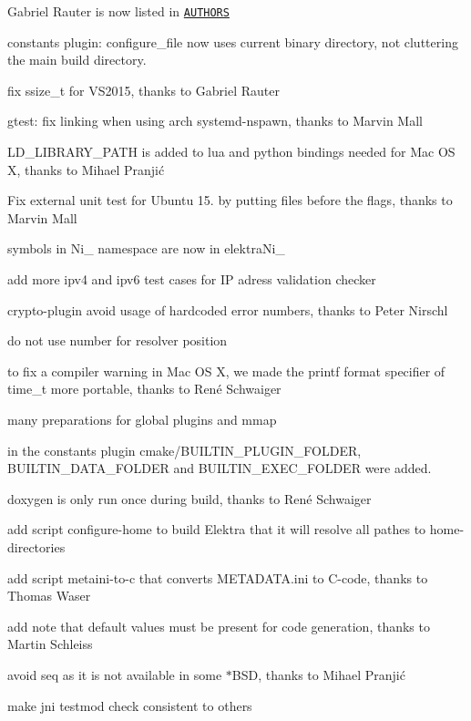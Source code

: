 \begin{DoxyItemize}
\item Gabriel Rauter is now listed in \href{https://github.com/elektrainitiative/libelektra/tree/master/doc/AUTHORS}{\tt A\+U\+T\+H\+O\+R\+S}
\item constants plugin\+: configure\+\_\+file now uses current binary directory, not cluttering the main build directory.
\item fix ssize\+\_\+t for V\+S2015, thanks to Gabriel Rauter
\item gtest\+: fix linking when using arch systemd-\/nspawn, thanks to Marvin Mall
\item {\ttfamily L\+D\+\_\+\+L\+I\+B\+R\+A\+R\+Y\+\_\+\+P\+A\+T\+H} is added to lua and python bindings needed for Mac O\+S X, thanks to Mihael Pranjić
\item Fix external unit test for Ubuntu 15. by putting files before the flags, thanks to Marvin Mall
\item symbols in Ni\+\_\+ namespace are now in elektra\+Ni\+\_\+
\item add more ipv4 and ipv6 test cases for I\+P adress validation checker
\item crypto-\/plugin avoid usage of hardcoded error numbers, thanks to Peter Nirschl
\item do not use number for resolver position
\item to fix a compiler warning in Mac O\+S X, we made the printf format specifier of time\+\_\+t more portable, thanks to René Schwaiger
\item many preparations for global plugins and mmap
\item in the constants plugin {\ttfamily cmake/\+B\+U\+I\+L\+T\+I\+N\+\_\+\+P\+L\+U\+G\+I\+N\+\_\+\+F\+O\+L\+D\+E\+R}, {\ttfamily B\+U\+I\+L\+T\+I\+N\+\_\+\+D\+A\+T\+A\+\_\+\+F\+O\+L\+D\+E\+R} and {\ttfamily B\+U\+I\+L\+T\+I\+N\+\_\+\+E\+X\+E\+C\+\_\+\+F\+O\+L\+D\+E\+R} were added.
\item doxygen is only run once during build, thanks to René Schwaiger
\item add script configure-\/home to build Elektra that it will resolve all pathes to home-\/directories
\item add script metaini-\/to-\/c that converts M\+E\+T\+A\+D\+A\+T\+A.\+ini to C-\/code, thanks to Thomas Waser
\item add note that default values must be present for code generation, thanks to Martin Schleiss
\item avoid {\ttfamily seq} as it is not available in some {\ttfamily $\ast$\+B\+S\+D}, thanks to Mihael Pranjić
\item make jni testmod check consistent to others
\end{DoxyItemize}

